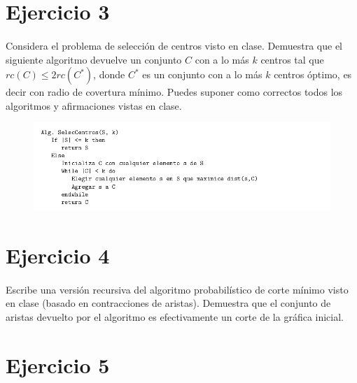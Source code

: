 \documentclass[12pt]{article}
\begin{document}
\section{Ejercicio 3}
	\paragraph{} Considera el problema de selección de centros visto en clase. Demuestra que el siguiente algoritmo devuelve un conjunto $C$ con a lo más $k$ centros tal que $rc(C)\leq 2rc(C^*)$, donde $C^*$ es un conjunto con a lo más $k$ centros óptimo, es decir con radio de covertura mínimo. Puedes suponer como correctos todos los algoritmos y afirmaciones vistas en clase.
	\begin{figure}[h]
		\begin{center}
			\includegraphics[width=\textwidth]{AlgCentros}
		\end{center}
	\end{figure}
\pagebreak
\section{Ejercicio 4}
\paragraph{} Escribe una versión recursiva del algoritmo probabilístico de corte mínimo visto en clase (basado en contracciones de aristas). Demuestra que el conjunto de aristas devuelto por el algoritmo es efectivamente un corte de la gráfica inicial.
\section{Ejercicio 5}
\end{document}
